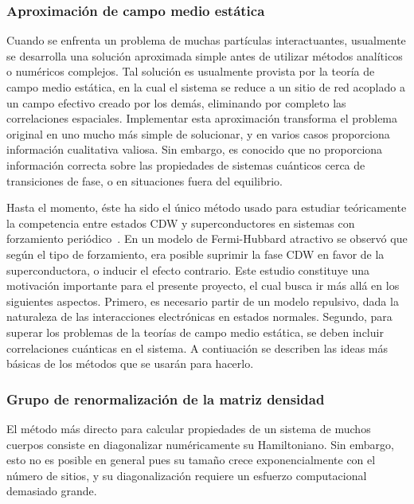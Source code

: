 \documentclass[a4paper,10pt]{article}
\begin{document}
\subsubsection{Aproximaci\'on de campo medio est\'atica} \label{campo_medio}
Cuando se enfrenta un problema de muchas part\'iculas interactuantes, usualmente se desarrolla una soluci\'on aproximada simple antes de utilizar m\'etodos anal\'iticos o num\'ericos complejos. Tal soluci\'on es usualmente provista por la teor\'ia de campo medio est\'atica, en la cual 
el sistema se reduce a un sitio de red acoplado a un campo efectivo creado por los dem\'as, eliminando por completo las correlaciones espaciales. Implementar esta aproximaci\'on transforma el problema original en uno mucho m\'as simple de solucionar, y en varios casos proporciona informaci\'on cualitativa valiosa. Sin embargo, es conocido que no proporciona informaci\'on correcta sobre las propiedades de sistemas cu\'anticos cerca de transiciones de fase, o en situaciones fuera del equilibrio.  

Hasta el momento, \'este ha sido el \'unico m\'etodo usado para estudiar te\'oricamente la competencia entre estados CDW y superconductores en sistemas con forzamiento peri\'odico~\cite{sentef2017prl}. En un modelo de Fermi-Hubbard atractivo se observ\'o que seg\'un el tipo de forzamiento, era posible suprimir la fase CDW en favor de la superconductora, o inducir el efecto contrario. Este estudio constituye una motivaci\'on importante para el presente proyecto, el cual busca ir m\'as all\'a en los siguientes aspectos. Primero, es necesario partir de un modelo repulsivo, dada la naturaleza de las interacciones electr\'onicas en estados normales. Segundo, para superar los problemas de la teor\'ias de campo medio est\'atica, se deben incluir correlaciones cu\'anticas en el sistema. A contiuaci\'on se describen las ideas m\'as b\'asicas de los m\'etodos que se usar\'an para hacerlo.

\subsubsection{Grupo de renormalizaci\'on de la matriz densidad}
El m\'etodo m\'as directo para calcular propiedades de un sistema de muchos cuerpos consiste en diagonalizar num\'ericamente su Hamiltoniano. Sin embargo, esto no es posible en general pues su tama\~no crece exponencialmente con el n\'umero de sitios, y su diagonalizaci\'on requiere un esfuerzo computacional demasiado grande. 
\end{document}
